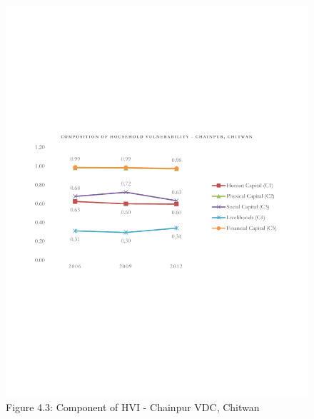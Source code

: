 \begin{center}
	\begin{figure}[H]
		\vspace{-140pt}
		\includegraphics[scale=0.7]{Graphs and figures/HVI_Component_Chainpur_line.pdf}
		\captionsetup{labelformat=empty, belowskip=0.01pt}
		\vspace{-160pt}
		\caption{Figure 4.3: Component of HVI - Chainpur VDC, Chitwan}
		\setlength{\abovecaptionskip}{6pt}
		\setlength{\belowcaptionskip}{3pt}
		\label{fig:hvichainpurComponent}
	\end{figure}
\end{center}
\vspace{-25pt}
